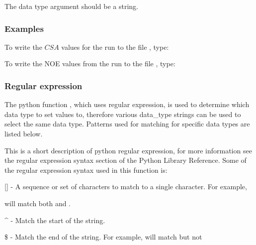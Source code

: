 The data type argument should be a string.


\subsubsection{Examples}

To write the $CSA$ values for the run 
 to the file 
, type:





To write the NOE values from the run 
 to the file 
, type:









\subsubsection{Regular expression}

The python function 
, which uses regular expression, is used to determine which data
type to set values to, therefore various data\_type strings can be used to select the same
data type.  Patterns used for matching for specific data types are listed below.

This is a short description of python regular expression, for more information see the
regular expression syntax section of the Python Library Reference.  Some of the regular
expression syntax used in this function is:

    [] - A sequence or set of characters to match to a single character.  For example,
    
 will match both 
 and 
.

    \^{} - Match the start of the string.

    \$ - Match the end of the string.  For example, 
 will match 
 but not 

